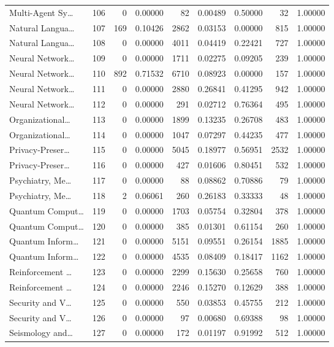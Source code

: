 \begin{table}
\begin{tabular}{lrrrrrrrr}
Multi-Agent Sy… & 106 & 0 & 0.00000 & 82 & 0.00489 & 0.50000 & 32 & 1.00000 \\
Natural Langua… & 107 & 169 & 0.10426 & 2862 & 0.03153 & 0.00000 & 815 & 1.00000 \\
Natural Langua… & 108 & 0 & 0.00000 & 4011 & 0.04419 & 0.22421 & 727 & 1.00000 \\
Neural Network… & 109 & 0 & 0.00000 & 1711 & 0.02275 & 0.09205 & 239 & 1.00000 \\
Neural Network… & 110 & 892 & 0.71532 & 6710 & 0.08923 & 0.00000 & 157 & 1.00000 \\
Neural Network… & 111 & 0 & 0.00000 & 2880 & 0.26841 & 0.41295 & 942 & 1.00000 \\
Neural Network… & 112 & 0 & 0.00000 & 291 & 0.02712 & 0.76364 & 495 & 1.00000 \\
Organizational… & 113 & 0 & 0.00000 & 1899 & 0.13235 & 0.26708 & 483 & 1.00000 \\
Organizational… & 114 & 0 & 0.00000 & 1047 & 0.07297 & 0.44235 & 477 & 1.00000 \\
Privacy-Preser… & 115 & 0 & 0.00000 & 5045 & 0.18977 & 0.56951 & 2532 & 1.00000 \\
Privacy-Preser… & 116 & 0 & 0.00000 & 427 & 0.01606 & 0.80451 & 532 & 1.00000 \\
Psychiatry, Me… & 117 & 0 & 0.00000 & 88 & 0.08862 & 0.70886 & 79 & 1.00000 \\
Psychiatry, Me… & 118 & 2 & 0.06061 & 260 & 0.26183 & 0.33333 & 48 & 1.00000 \\
Quantum Comput… & 119 & 0 & 0.00000 & 1703 & 0.05754 & 0.32804 & 378 & 1.00000 \\
Quantum Comput… & 120 & 0 & 0.00000 & 385 & 0.01301 & 0.61154 & 260 & 1.00000 \\
Quantum Inform… & 121 & 0 & 0.00000 & 5151 & 0.09551 & 0.26154 & 1885 & 1.00000 \\
Quantum Inform… & 122 & 0 & 0.00000 & 4535 & 0.08409 & 0.18417 & 1162 & 1.00000 \\
Reinforcement … & 123 & 0 & 0.00000 & 2299 & 0.15630 & 0.25658 & 760 & 1.00000 \\
Reinforcement … & 124 & 0 & 0.00000 & 2246 & 0.15270 & 0.12629 & 388 & 1.00000 \\
Security and V… & 125 & 0 & 0.00000 & 550 & 0.03853 & 0.45755 & 212 & 1.00000 \\
Security and V… & 126 & 0 & 0.00000 & 97 & 0.00680 & 0.69388 & 98 & 1.00000 \\
Seismology and… & 127 & 0 & 0.00000 & 172 & 0.01197 & 0.91992 & 512 & 1.00000 \\

\end{tabular}
\end{table}
